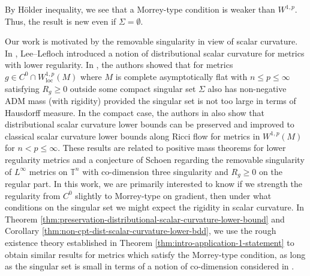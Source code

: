 \documentclass[12pt]{amsart}
\theoremstyle{plain}
\theoremstyle{plain}
\theoremstyle{definition}
\theoremstyle{remark}
\numberwithin{equation}{subsection}
\begin{document}
By H\"older inequality, we see that  a Morrey-type condition is weaker than $W^{1,p}$. Thus, the result is new even if $\Sigma=\emptyset$.







Our work is motivated by the removable singularity in view of scalar curvature. In \cite{lee_positive_2015}, Lee--Lefloch introduced a notion of distributional scalar curvature for metrics with lower regularity. In \cite{jiang_removable_2022}, the authors showed that for metrics $g \in C^0 \cap W^{1,p}_{\text{loc}}(M)$ where $M$ is complete asymptotically flat with $n \leq p \leq \infty$ satisfying $R_g \geq 0$ outside some compact singular set $\Sigma$ also has non-negative ADM mass (with rigidity) provided the singular set is not too large in terms of Hausdorff measure. In the compact case,  the authors in \cite{jiang_weak_2021} also show that distributional scalar curvature lower bounds can be preserved and improved to classical scalar curvature lower bounds along Ricci flow for metrics in $W^{1,p}(M)$ for $n < p \leq \infty$. These results are related to positive mass theorems for lower regularity metrics and a conjecture of Schoen regarding the removable singularity of $L^\infty$ metrics on $\mathbb{T}^n$ with co-dimension three singularity and $R_g \geq 0$ on the regular part. In this work, we are primarily interested to know if we strength the regularity from $C^0$ slightly to Morrey-type on gradient, then under what conditions on the singular set we might expect the rigidity in scalar curvature.  In Theorem \ref{thm:preservation-distributional-scalar-curvature-lower-bound} and Corollary \ref{thm:non-cpt-dist-scalar-curvature-lower-bdd}, we use the rough existence theory established in Theorem \ref{thm:intro-application-1-statement} to obtain similar results for metrics which satisfy the Morrey-type condition, as long as the singular set is small in terms of a notion of co-dimension considered in \cite{lee_continuous_2021}.
\end{document}
